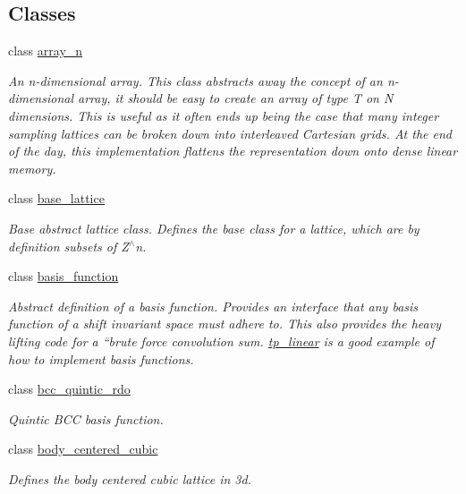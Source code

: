 \subsection*{Classes}
\begin{DoxyCompactItemize}
\item 
class \hyperlink{classsisl_1_1array__n}{array\+\_\+n}
\begin{DoxyCompactList}\small\item\em An n-\/dimensional array. This class abstracts away the concept of an n-\/dimensional array, it should be easy to create an array of type T on N dimensions. This is useful as it often ends up being the case that many integer sampling lattices can be broken down into interleaved Cartesian grids. At the end of the day, this implementation flattens the representation down onto dense linear memory. \end{DoxyCompactList}\item 
class \hyperlink{classsisl_1_1base__lattice}{base\+\_\+lattice}
\begin{DoxyCompactList}\small\item\em Base abstract lattice class. Defines the base class for a lattice, which are by definition subsets of Z$^\wedge$n. \end{DoxyCompactList}\item 
class \hyperlink{classsisl_1_1basis__function}{basis\+\_\+function}
\begin{DoxyCompactList}\small\item\em Abstract definition of a basis function. Provides an interface that any basis function of a shift invariant space must adhere to. This also provides the heavy lifting code for a ``brute force\textquotesingle{}\textquotesingle{} convolution sum. \hyperlink{classsisl_1_1tp__linear}{tp\+\_\+linear} is a good example of how to implement basis functions. \end{DoxyCompactList}\item 
class \hyperlink{classsisl_1_1bcc__quintic__rdo}{bcc\+\_\+quintic\+\_\+rdo}
\begin{DoxyCompactList}\small\item\em Quintic B\+CC basis function. \end{DoxyCompactList}\item 
class \hyperlink{classsisl_1_1body__centered__cubic}{body\+\_\+centered\+\_\+cubic}
\begin{DoxyCompactList}\small\item\em Defines the body centered cubic lattice in 3d. \end{DoxyCompactList}\item 

\end{DoxyCompactItemize}
